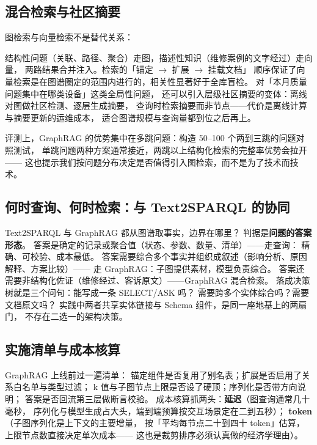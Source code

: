 \subsection{混合检索与社区摘要}

图检索与向量检索不是替代关系：



结构性问题（关联、路径、聚合）走图，描述性知识（维修案例的文字经过）走向量，
两路结果合并注入。检索的「锚定 \(\rightarrow\) 扩展 \(\rightarrow\) 挂载文档」
顺序保证了向量检索是在图谱圈定的范围内进行的，相关性显著好于全库盲检。
对「本月质量问题集中在哪类设备」这类全局性问题，
还可以引入层级社区摘要的变体：离线对图做社区检测、逐层生成摘要，
查询时检索摘要而非节点——代价是离线计算与摘要更新的运维成本，
适合图谱规模与查询量都到位之后再上。

评测上，GraphRAG 的优势集中在多跳问题：构造 50--100 个两到三跳的问题对照测试，
单跳问题两种方案通常接近，两跳以上结构化检索的完整率优势会拉开——
这也提示我们按问题分布决定是否值得引入图检索，而不是为了技术而技术。

\subsection{何时查询、何时检索：与 Text2SPARQL 的协同}

Text2SPARQL 与 GraphRAG 都从图谱取事实，边界在哪里？
判据是\textbf{问题的答案形态}。
答案是确定的记录或聚合值（状态、参数、数量、清单）——走查询：
精确、可校验、成本最低。
答案需要综合多个事实并组织成叙述（影响分析、原因解释、方案比较）——
走 GraphRAG：子图提供素材，模型负责综合。
答案还需要非结构化佐证（维修经过、客诉原文）——GraphRAG 混合检索。
落成决策树就是三个问句：能写成一条 SELECT/ASK 吗？
需要跨多个实体综合吗？需要文档原文吗？
实践中两者共享实体链接与 Schema 组件，是同一座地基上的两扇门，
不存在二选一的架构决策。

\subsection{实施清单与成本核算}

GraphRAG 上线前过一遍清单：
锚定组件是否复用了别名表；扩展是否启用了关系白名单与类型过滤；
k 值与子图节点上限是否设了硬顶；序列化是否带方向说明；
答案是否回流第三层做断言校验。
成本核算抓两头：\textbf{延迟}（图查询通常几十毫秒，
序列化与模型生成占大头，端到端预算按交互场景定在二到五秒）；
\textbf{token}（子图序列化是上下文的主要增量，
按「平均每节点二十到四十 token」估算，上限节点数直接决定单次成本——
这也是裁剪排序必须认真做的经济学理由）。

